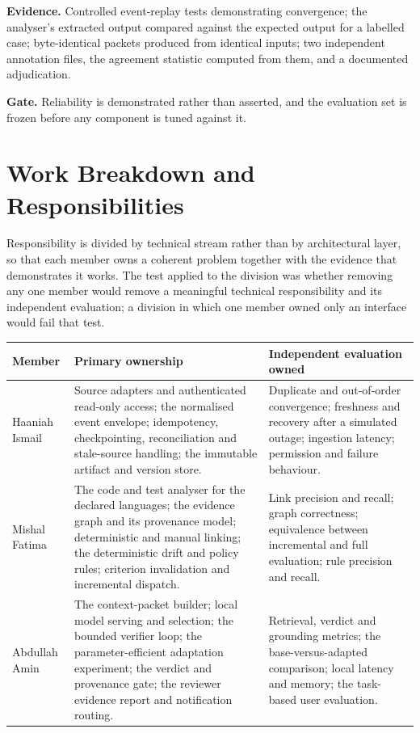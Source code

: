 \textbf{Evidence.} Controlled event-replay tests demonstrating convergence; the
analyser's extracted output compared against the expected output for a labelled
case; byte-identical packets produced from identical inputs; two independent
annotation files, the agreement statistic computed from them, and a documented
adjudication.

\textbf{Gate.} Reliability is demonstrated rather than asserted, and the
evaluation set is frozen before any component is tuned against it.

\section{Work Breakdown and Responsibilities}

Responsibility is divided by technical stream rather than by architectural
layer, so that each member owns a coherent problem together with the evidence
that demonstrates it works. The test applied to the division was whether
removing any one member would remove a meaningful technical responsibility and
its independent evaluation; a division in which one member owned only an
interface would fail that test.

\begin{longtable}{>{\raggedright\arraybackslash}p{}>{\raggedright\arraybackslash}p{}>{\raggedright\arraybackslash}p{}}
\toprule
Member & Primary ownership & Independent evaluation owned \\
\midrule
\endhead
Haaniah Ismail
  & Source adapters and authenticated read-only access; the normalised event
    envelope; idempotency, checkpointing, reconciliation and stale-source
    handling; the immutable artifact and version store.
  & Duplicate and out-of-order convergence; freshness and recovery after a
    simulated outage; ingestion latency; permission and failure behaviour. \\
Mishal Fatima
  & The code and test analyser for the declared languages; the evidence graph
    and its provenance model; deterministic and manual linking; the
    deterministic drift and policy rules; criterion invalidation and incremental
    dispatch.
  & Link precision and recall; graph correctness; equivalence between
    incremental and full evaluation; rule precision and recall. \\
Abdullah Amin
  & The context-packet builder; local model serving and selection; the bounded
    verifier loop; the parameter-efficient adaptation experiment; the verdict
    and provenance gate; the reviewer evidence report and notification routing.
  & Retrieval, verdict and grounding metrics; the base-versus-adapted
    comparison; local latency and memory; the task-based user evaluation. \\
\bottomrule
\end{longtable}

